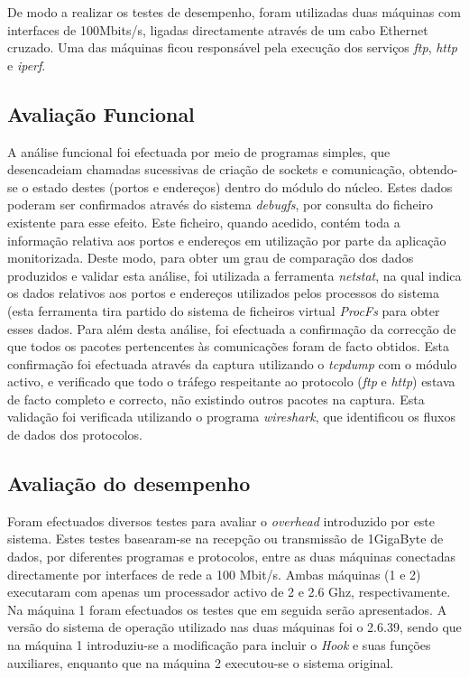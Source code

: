 \documentclass[a4paper]{llncs}
\newcommand{\td}[1]{\todo[inline]{#1}}
\begin{document}

De modo a realizar os testes de desempenho, foram utilizadas duas máquinas com interfaces de 100Mbits/s, ligadas directamente através de um cabo Ethernet cruzado. Uma das máquinas ficou responsável pela execução dos serviços \textit{ftp}, \textit{http} e \textit{iperf}.

\subsection{Avaliação Funcional}
A análise funcional foi efectuada por meio de programas simples, que desencadeiam chamadas sucessivas de criação de sockets e comunicação, obtendo-se o estado destes (portos e endereços) dentro do módulo do núcleo. Estes dados poderam ser confirmados através do sistema \textit{debugfs}, por consulta do ficheiro existente para esse efeito. Este ficheiro, quando acedido, contém toda a informação relativa aos portos e endereços em utilização por parte da aplicação monitorizada.
Deste modo, para obter um grau de comparação dos dados produzidos e validar esta análise, foi utilizada a ferramenta \textit{netstat}, na qual indica os dados relativos aos portos e endereços utilizados pelos processos do sistema (esta ferramenta tira partido do sistema de ficheiros virtual \textit{ProcFs} para obter esses dados.
Para além desta análise, foi efectuada a confirmação da correcção de que todos os pacotes pertencentes às comunicações foram de facto obtidos. Esta confirmação foi efectuada através da captura utilizando o \textit{tcpdump} com o módulo activo, e verificado que todo o tráfego respeitante ao protocolo (\textit{ftp} e \textit{http}) estava de facto completo e correcto, não existindo outros pacotes na captura. Esta validação foi verificada utilizando o programa \textit{wireshark}, que identificou os fluxos de dados dos protocolos.

\subsection{Avaliação do desempenho}
Foram efectuados diversos testes para avaliar o \emph{overhead} introduzido por este sistema. Estes testes basearam-se na recepção ou transmissão de 1GigaByte de dados, por diferentes programas e protocolos, entre as duas máquinas conectadas directamente por interfaces de rede a 100 Mbit/s. Ambas máquinas (1 e 2) executaram com apenas um processador activo de 2 e 2.6 Ghz, respectivamente. Na máquina 1 foram efectuados os testes que em seguida serão apresentados. A versão do sistema de operação utilizado nas duas máquinas foi o 2.6.39, sendo que na máquina 1 introduziu-se a modificação para incluir o \textit{Hook} e suas funções auxiliares, enquanto que na máquina 2 executou-se o sistema original.
\end{document}
